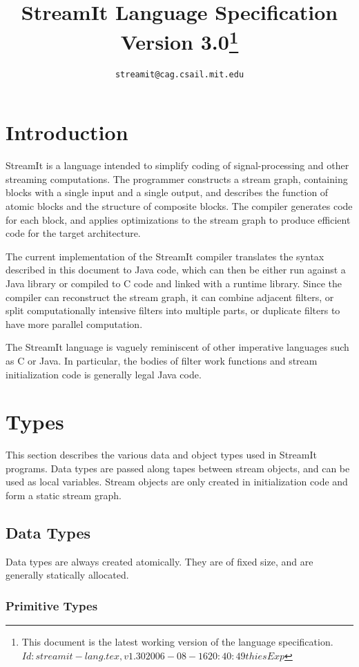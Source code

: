 \documentclass[11pt]{article}
\title{StreamIt Language Specification\\
Version 3.0\ifprerel\thanks{
This document is the latest working version of the language specification.\hfil\break\ttfamily
\hbox{$Id: streamit-lang.tex,v 1.30 2006-08-16 20:40:49 thies Exp $}
}\fi}
\author{\texttt{streamit@cag.csail.mit.edu}}
\begin{document}
\maketitle
\tableofcontents

\section{Introduction}

StreamIt is a language intended to simplify coding of
signal-processing and other streaming computations.  The programmer
constructs a stream graph, containing blocks with a single input and a
single output, and describes the function of atomic blocks and the
structure of composite blocks.  The compiler generates code for each
block, and applies optimizations to the stream graph to produce
efficient code for the target architecture.

The current implementation of the StreamIt compiler translates the
syntax described in this document to Java code, which can then be
either run against a Java library or compiled to C code and linked
with a runtime library.  Since the compiler can reconstruct the stream
graph, it can combine adjacent filters, or split computationally
intensive filters into multiple parts, or duplicate filters to have
more parallel computation.

The StreamIt language is vaguely reminiscent of other imperative
languages such as C or Java.  In particular, the bodies of filter work
functions and stream initialization code is generally legal Java
code.

\section{Types}

This section describes the various data and object types used in
StreamIt programs.  Data types are passed along tapes between stream
objects, and can be used as local variables.  Stream objects are only
created in initialization code and form a static stream graph.

\subsection{Data Types}

Data types are always created atomically.  They are of fixed size, and
are generally statically allocated.

\subsubsection{Primitive Types}
\label{sec:primitive-types}
\end{document}
